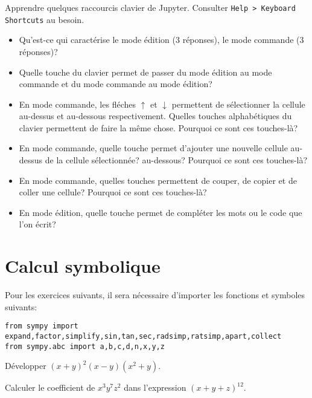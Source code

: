 
\begin{exercice}
Apprendre quelques raccourcis clavier de Jupyter.
Consulter \texttt{Help > Keyboard Shortcuts} au besoin.
\begin{itemize}
\item Qu'est-ce qui caractérise le mode édition (3 réponses), le mode commande
(3 réponses)?
\item Quelle touche du clavier permet de passer du mode édition au mode commande
et du mode commande au mode édition?
\item En mode commande, les fléches $\uparrow$ et $\downarrow$ permettent de
sélectionner la cellule au-dessus et au-dessous respectivement. Quelles touches
alphabétiques du clavier permettent de faire la même chose. Pourquoi ce sont ces
touches-là?
\item En mode commande, quelle touche permet d'ajouter une nouvelle cellule
au-dessus de la cellule sélectionnée? au-dessous? Pourquoi ce sont ces touches-là?
\item En mode commande, quelles touches permettent de couper, de copier et de
coller une cellule? Pourquoi ce sont ces touches-là?
\item En mode édition, quelle touche permet de compléter les mots ou le code que
l'on écrit?
\end{itemize}
\end{exercice}

\section{Calcul symbolique}


Pour les exercices suivants, il sera nécessaire d'importer les fonctions
et symboles suivants:
\begin{verbatim}
from sympy import expand,factor,simplify,sin,tan,sec,radsimp,ratsimp,apart,collect
from sympy.abc import a,b,c,d,n,x,y,z
\end{verbatim}

\begin{exercice}
Développer $(x+y)^2(x-y)(x^2+y)$.
\end{exercice}

\begin{exercice}
    Calculer le coefficient de $x^3y^7z^2$ dans l'expression $(x+y+z)^{12}$.
\end{exercice}

